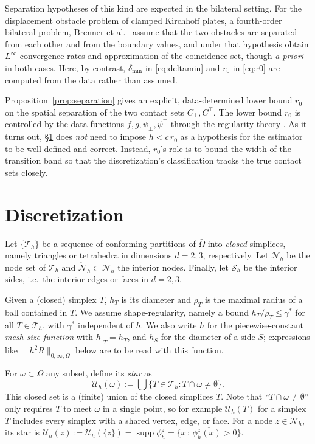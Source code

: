 \documentclass[12pt]{amsart}
\theoremstyle{definition}
\newcommand{\Om}{\Omega}
\newcommand{\psilo}{\psi_\bot}
\newcommand{\psiup}{\psi^\top}
\newcommand{\Cbot}{C_\bot}
\newcommand{\Ctop}{C^\top}
\newcommand{\Th}{\mathcal{T}_h}
\newcommand{\Nh}{\mathcal{N}_h}
\newcommand{\Nhr}{\mathring{\mathcal{N}}_h}
\newcommand{\Sh}{\mathcal{S}_h}
\newcommand{\Uh}{\mathcal{U}_h}
\begin{document}
Separation hypotheses of this kind are expected in the bilateral setting.  For the displacement obstacle problem of clamped Kirchhoff plates, a fourth-order bilateral problem, Brenner et al.~\cite{Brenneretal2012} assume that the two obstacles are separated from each other and from the boundary values, and under that hypothesis obtain $L^\infty$ convergence rates and approximation of the coincidence set, though \emph{a priori} in both cases.  Here, by contrast, $\delta_{\min}$ in \eqref{eq:deltamin} and $r_0$ in \eqref{eq:r0} are computed from the data rather than assumed.

Proposition~\ref{prop:separation} gives an explicit, data-determined lower bound $r_0$ on the spatial separation of the two contact sets  $\Cbot, \Ctop$.  The lower bound $r_0$ is controlled by the data functions $f,g,\psilo,\psiup$ through the regularity theory \cite{KinderlehrerStampacchia1980}.  As it turns out, \S \ref{sec:discretization} does \emph{not} need to impose $h < c\,r_0$ as a hypothesis for the estimator to be well-defined and correct.  Instead, $r_0$'s role is to bound the width of the transition band so that the discretization's classification tracks the true contact sets closely.


\section{Discretization} \label{sec:discretization}

Let $\{\Th\}$ be a sequence of conforming partitions of $\bar\Om$ into \emph{closed} simplices, namely triangles or tetrahedra in dimensions $d=2,3$, respectively.  Let $\Nh$ be the node set of $\Th$ and $\Nhr \subset \Nh$ the interior nodes.  Finally, let $\Sh$ be the interior sides, i.e.~the interior edges or faces in $d=2,3$.

Given a (closed) simplex $T$, $h_T$ is its diameter and $\rho_T$ is the maximal radius of a ball contained in $T$.  We assume shape-regularity, namely a bound $h_T/\rho_T \le \gamma^*$ for all $T \in \Th$, with $\gamma^*$ independent of $h$.  We also write $h$ for the piecewise-constant \emph{mesh-size function} with $h|_T = h_T$, and $h_S$ for the diameter of a side $S$; expressions like $\|h^2 R\|_{0,\infty;\Om}$ below are to be read with this function.

For $\omega \subset \bar\Om$ any subset, define its \emph{star} as
\begin{equation}
\label{eq:star}
\Uh(\omega) := \bigcup\{T \in \Th : T \cap \omega \ne \emptyset\}.
\end{equation}
This closed set is a (finite) union of the closed simplices $T$.  Note that ``$T \cap \omega \ne \emptyset$'' only requires $T$ to meet $\omega$ in a single point, so for example $\Uh(T)$ for a simplex $T$ includes every simplex with a shared vertex, edge, or face.  For a node $z \in \Nh$, its star \cite{Langeetal2016} is $\Uh(z) := \Uh(\{z\}) = \operatorname{supp} \phi_h^z= \overline{\{x\,:\,\phi_h^z(x) > 0\}}$.
\end{document}
